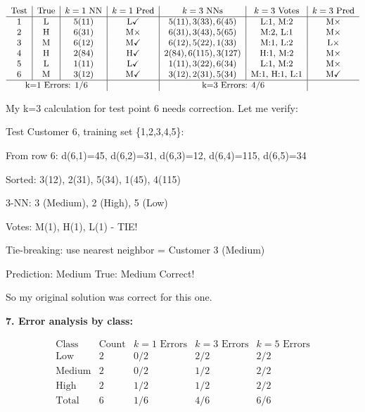 \documentclass[12pt]{article}
\begin{document}
\begin{computation}
\[
\small
\begin{array}{c|c|c|c|c|c|c}
\text{Test} & \text{True} & k=1 \text{ NN} & k=1 \text{ Pred} & k=3 \text{ NNs} & k=3 \text{ Votes} & k=3 \text{ Pred} \\
\hline
1 & \text{L} & 5(11) & \text{L} \checkmark & 5(11), 3(33), 6(45) & \text{L:1, M:2} & \text{M} \times \\
2 & \text{H} & 6(31) & \text{M} \times & 6(31), 3(43), 5(65) & \text{M:2, L:1} & \text{M} \times \\
3 & \text{M} & 6(12) & \text{M} \checkmark & 6(12), 5(22), 1(33) & \text{M:1, L:2} & \text{L} \times \\
4 & \text{H} & 2(84) & \text{H} \checkmark & 2(84), 6(115), 3(127) & \text{H:1, M:2} & \text{M} \times \\
5 & \text{L} & 1(11) & \text{L} \checkmark & 1(11), 3(22), 6(34) & \text{L:1, M:2} & \text{M} \times \\
6 & \text{M} & 3(12) & \text{M} \checkmark & 3(12), 2(31), 5(34) & \text{M:1, H:1, L:1} & \text{M} \checkmark \\
\hline
\multicolumn{3}{c|}{\text{k=1 Errors: 1/6}} & & \multicolumn{2}{c|}{\text{k=3 Errors: 4/6}} & \\
\end{array}
\]

My k=3 calculation for test point 6 needs correction. Let me verify:

Test Customer 6, training set \{1,2,3,4,5\}:

From row 6: d(6,1)=45, d(6,2)=31, d(6,3)=12, d(6,4)=115, d(6,5)=34

Sorted: 3(12), 2(31), 5(34), 1(45), 4(115)

3-NN: 3 (Medium), 2 (High), 5 (Low)

Votes: M(1), H(1), L(1) - TIE!

Tie-breaking: use nearest neighbor = Customer 3 (Medium)

Prediction: Medium
True: Medium
Correct! \checkmark

So my original solution was correct for this one.

\textbf{7. Error analysis by class:}

\[
\begin{array}{c|c|c|c|c}
\text{Class} & \text{Count} & k=1 \text{ Errors} & k=3 \text{ Errors} & k=5 \text{ Errors} \\
\hline
\text{Low} & 2 & 0/2 & 2/2 & 2/2 \\
\text{Medium} & 2 & 0/2 & 1/2 & 2/2 \\
\text{High} & 2 & 1/2 & 1/2 & 2/2 \\
\hline
\text{Total} & 6 & 1/6 & 4/6 & 6/6 \\
\end{array}
\]


\end{computation}
\end{document}
